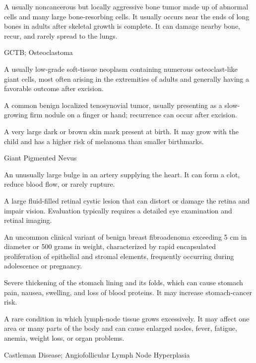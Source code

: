  A usually noncancerous but locally aggressive bone tumor made up of abnormal cells and many large bone-resorbing cells. It usually occurs near the ends of long bones in adults after skeletal growth is complete. It can damage nearby bone, recur, and rarely spread to the lungs.

\synonyms
GCTB; Osteoclastoma

 A usually low-grade soft-tissue neoplasm containing numerous osteoclast-like giant cells, most often arising in the extremities of adults and generally having a favorable outcome after excision.

 A common benign localized tenosynovial tumor, usually presenting as a slow-growing firm nodule on a finger or hand; recurrence can occur after excision.

 A very large dark or brown skin mark present at birth. It may grow with the child and has a higher risk of melanoma than smaller birthmarks.

\synonyms
Giant Pigmented Nevus

 An unusually large bulge in an artery supplying the heart. It can form a clot, reduce blood flow, or rarely rupture.

 A large fluid-filled retinal cystic lesion that can distort or damage the retina and impair vision. Evaluation typically requires a detailed eye examination and retinal imaging.

 An uncommon clinical variant of benign breast fibroadenoma exceeding 5 cm in diameter or 500 grams in weight, characterized by rapid encapsulated proliferation of epithelial and stromal elements, frequently occurring during adolescence or pregnancy.

 Severe thickening of the stomach lining and its folds, which can cause stomach pain, nausea, swelling, and loss of blood proteins. It may increase stomach-cancer risk.

 A rare condition in which lymph-node tissue grows excessively. It may affect one area or many parts of the body and can cause enlarged nodes, fever, fatigue, anemia, weight loss, or organ problems.

\synonyms
Castleman Disease; Angiofollicular Lymph Node Hyperplasia

